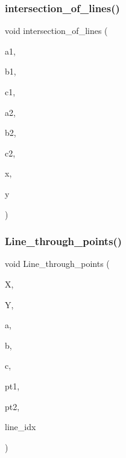 \mbox{\label{draw_8_c_a8e5b79dda93db3b0b557c5e78ccec99d}} 
\subsubsection{\texorpdfstring{intersection\+\_\+of\+\_\+lines()}{intersection\_of\_lines()}}
{\footnotesize\ttfamily void intersection\+\_\+of\+\_\+lines (\begin{DoxyParamCaption}\item[{double}]{a1,  }\item[{double}]{b1,  }\item[{double}]{c1,  }\item[{double}]{a2,  }\item[{double}]{b2,  }\item[{double}]{c2,  }\item[{double \&}]{x,  }\item[{double \&}]{y }\end{DoxyParamCaption})}

\mbox{\label{draw_8_c_ab75a4d12a81cf7069ae5f4d7e2c9b1b7}} 
\subsubsection{\texorpdfstring{Line\+\_\+through\+\_\+points()}{Line\_through\_points()}}
{\footnotesize\ttfamily void Line\+\_\+through\+\_\+points (\begin{DoxyParamCaption}\item[{double $\ast$}]{X,  }\item[{double $\ast$}]{Y,  }\item[{double $\ast$}]{a,  }\item[{double $\ast$}]{b,  }\item[{double $\ast$}]{c,  }\item[{\mbox{\hyperlink{galois_8h_a09fddde158a3a20bd2dcadb609de11dc}{I\+NT}}}]{pt1,  }\item[{\mbox{\hyperlink{galois_8h_a09fddde158a3a20bd2dcadb609de11dc}{I\+NT}}}]{pt2,  }\item[{\mbox{\hyperlink{galois_8h_a09fddde158a3a20bd2dcadb609de11dc}{I\+NT}}}]{line\+\_\+idx }\end{DoxyParamCaption})}


